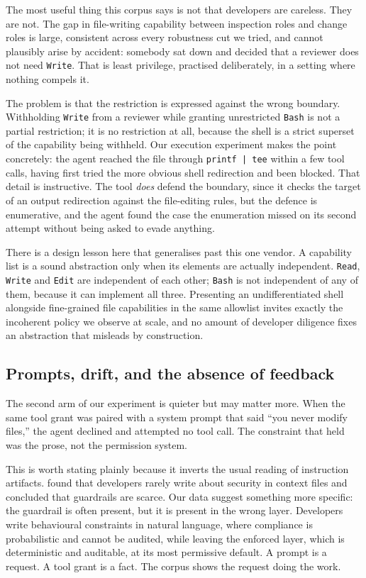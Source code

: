 \documentclass[smallextended,natbib]{svjour3}
\newcommand{\code}[1]{\texttt{\small #1}}
\begin{document}
The most useful thing this corpus says is not that developers are careless. They are not. The gap in
file-writing capability between inspection roles and change roles is large, consistent across every
robustness cut we tried, and cannot plausibly arise by accident: somebody sat down and decided that a
reviewer does not need \code{Write}. That is least privilege, practised deliberately, in a setting
where nothing compels it.

The problem is that the restriction is expressed against the wrong boundary. Withholding \code{Write}
from a reviewer while granting unrestricted \code{Bash} is not a partial restriction; it is no
restriction at all, because the shell is a strict superset of the capability being withheld. Our
execution experiment makes the point concretely: the agent reached the file through
\code{printf | tee} within a few tool calls, having first tried the more obvious shell redirection and
been blocked. That detail is instructive. The tool \emph{does} defend the boundary, since it checks the
target of an output redirection against the file-editing rules, but the defence is enumerative, and
the agent found the case the enumeration missed on its second attempt without being asked to evade
anything.

There is a design lesson here that generalises past this one vendor. A capability list is a sound
abstraction only when its elements are actually independent. \code{Read}, \code{Write} and \code{Edit}
are independent of each other; \code{Bash} is not independent of any of them, because it can
implement all three. Presenting an undifferentiated shell alongside fine-grained file capabilities in
the same allowlist invites exactly the incoherent policy we observe at scale, and no amount of
developer diligence fixes an abstraction that misleads by construction.

\subsection{Prompts, drift, and the absence of feedback}

The second arm of our experiment is quieter but may matter more. When the same tool grant was paired
with a system prompt that said ``you never modify files,'' the agent declined and attempted no tool
call. The constraint that held was the prose, not the permission system.

This is worth stating plainly because it inverts the usual reading of instruction artifacts.
\citet{chatlatanagulchai2025readmes} found that developers rarely write about security in context
files and concluded that guardrails are scarce. Our data suggest something more specific: the
guardrail is often present, but it is present in the wrong layer. Developers write behavioural
constraints in natural language, where compliance is probabilistic and cannot be audited, while
leaving the enforced layer, which is deterministic and auditable, at its most permissive default.
A prompt is a request. A tool grant is a fact. The corpus shows the request doing the work.
\end{document}

